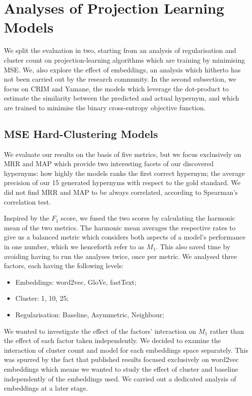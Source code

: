 \section{Analyses of Projection Learning Models}
We split the evaluation in two, starting from an analysis of regularisation and cluster count on projection-learning algorithms which are training by minimising \ac{MSE}.  We, also explore the effect of embeddings, an analysis which hitherto has not been carried out by the research community.  In the second subsection, we focus on CRIM and Yamane, the models which leverage the dot-product to estimate the similarity between the predicted and actual hypernym, and which are trained to minimise the binary cross-entropy objective function.

\subsection{MSE Hard-Clustering Models}
We evaluate our results on the basis of five metrics, but we focus exclusively on \ac{MRR} and \ac{MAP} which provide two interesting facets of our discovered hypernyms: how highly the models ranks  the first correct hypernym; the average precision of our 15 generated hypernyms with respect to the gold standard.  We did not find \ac{MRR} and \ac{MAP} to be always correlated, according to Spearman's correlation test.

Inspired by the $F_1$ score, we fused the two scores by calculating the harmonic mean of the two metrics.  The harmonic mean averages the respective rates to give us a balanced metric which considers both aspects of a model's performance in one number, which we henceforth refer to as $M_1$.  This also saved time by avoiding having to run the analyses twice, once per metric.  We analysed three factors, each having the following levels:
\begin{itemize}
    \item Embeddings: word2vec, GloVe, fastText;
    \item Cluster: 1, 10, 25;
    \item Regularisation: Baseline, Asymmetric, Neighbour;
\end{itemize}

We wanted to investigate the effect of the factors' interaction on $M_1$ rather than the effect of each factor taken independently.  We decided to examine the interaction of cluster count and model for each embeddings space separately.  This was spurred by the fact that published results focused exclusively on word2vec embeddings which means we wanted to study the effect of cluster and baseline independently of the embeddings used.  We carried out a dedicated analysis of embeddings at a later stage.  

